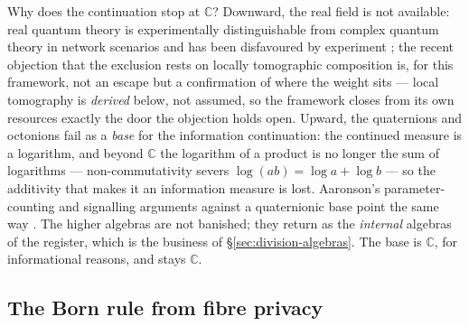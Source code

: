 Why does the continuation stop at $\mathbb{C}$? Downward, the real field is not available: real
quantum theory is experimentally distinguishable from complex quantum theory in network scenarios
and has been disfavoured by experiment
\autocite{renou2021real,chen2022ruling,wu2022refutation}; the recent objection that the exclusion
rests on locally tomographic composition \autocite{hoffreumonwoods2026real} is, for this framework,
not an escape but a confirmation of where the weight sits --- local tomography is \emph{derived}
below, not assumed, so the framework closes from its own resources exactly the door the objection
holds open. Upward, the quaternions and octonions fail as a \emph{base} for the information
continuation: the continued measure is a logarithm, and beyond $\mathbb{C}$ the logarithm of a
product is no longer the sum of logarithms --- non-commutativity severs
$\log(ab) = \log a + \log b$ --- so the additivity that makes it an information measure is lost.
Aaronson's parameter-counting and signalling arguments against a quaternionic base point the same
way \autocite{Aaronson2004h}. The higher algebras are not banished; they return as the
\emph{internal} algebras of the register, which is the business of \S\ref{sec:division-algebras}.
The base is $\mathbb{C}$, for informational reasons, and stays $\mathbb{C}$.

\subsection{The Born rule from fibre privacy}\label{sec:born-rule}

